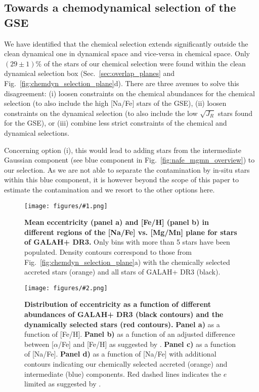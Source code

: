 \documentclass[fleqn,usenatbib]{mnras}
\newcommand{\codeicon}{{\faCloudDownload}}
\newcommand{\codelink}[1]{\href{https://github.com/svenbuder/Accreted-stars-in-GALAH-DR3/tree/main/figures/#1.ipynb}{\codeicon}\,\,}
\newcommand{\oscaption}[2]{\caption{#2 \codelink{#1}}}
\newcommand{\figuretextwidth}[4]{\begin{figure*} \centering \texttt{[image: figures/\#2.png]}\oscaption{#3}{#4}\label{fig:#2} \end{figure*}}
\newcommand{\figurecolumnwidth}[3]{\begin{figure} \centering \texttt{[image: figures/\#1.png]}\oscaption{#2}{#3}\label{fig:#1} \end{figure}}
\begin{document}
\subsection{Towards a chemodynamical selection of the GSE} \label{sec:towards_chemodyn}

We have identified that the chemical selection extends significantly outside the clean dynamical one in dynamical space and vice-versa in chemical space. Only $(29\pm1)\%$ of the stars of our chemical selection were found within the clean dynamical selection box (Sec.~\ref{sec:overlap_planes} and Fig.~\ref{fig:chemdyn_selection_plane}d). There are three avenues to solve this disagreement:
(i) loosen constraints on the chemical abundances for the chemical selection (to also include the high [Na/Fe] stars of the GSE), 
(ii) loosen constraints on the dynamical selection (to also include the low $\sqrt{J_R}$ stars found for the GSE), or 
(iii) combine less strict constraints of the chemical and dynamical selections.

Concerning option (i), this would lead to adding stars from the intermediate Gaussian component (see blue component in Fig.~\ref{fig:nafe_mgmn_overview}) to our selection. As we are not able to separate the contamination by in-situ stars within this blue component, it is however beyond the scope of this paper to estimate the contamination and we resort to the other options here.

\figurecolumnwidth{NaFe_MgMn_Fe_H_ecc}{chronochemodynamic_comparison}{
\textbf{Mean eccentricity (panel a) and [Fe/H] (panel b) in different regions of the [Na/Fe] vs. [Mg/Mn] plane for stars of GALAH+ DR3.}
Only bins with more than 5 stars have been populated.
Density contours correspond to those from Fig.~\ref{fig:chemdyn_selection_plane}a) with the chemically selected accreted stars (orange) and all stars of GALAH+ DR3 (black).
}

\figuretextwidth{17cm}{nafe_e}{chronochemodynamic_comparison}{
\textbf{Distribution of eccentricity as a function of different abundances of GALAH+ DR3 (black contours) and the dynamically selected stars (red contours).}
\textbf{Panel a)} as a function of [Fe/H].
\textbf{Panel b)} as a function of an adjusted difference between [$\alpha$/Fe] and [Fe/H] as suggested by \citet{Naidu2020}.
\textbf{Panel c)} as a function of [Na/Fe].
\textbf{Panel d)} as a function of [Na/Fe] with additional contours indicating our chemically selected accreted (orange) and intermediate (blue) components.
Red dashed lines indicates the $e$ limited as suggested by \citet{Naidu2020}.
}
\end{document}
